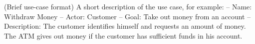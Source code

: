 
(Brief use-case format)
A short description of the use case, for
example:
– Name: Withdraw Money
– Actor: Customer
– Goal: Take out money from an account
– Description: The customer identifies
himself and requests an amount of
money. The ATM gives out money if the
customer has sufficient funds in his
account.